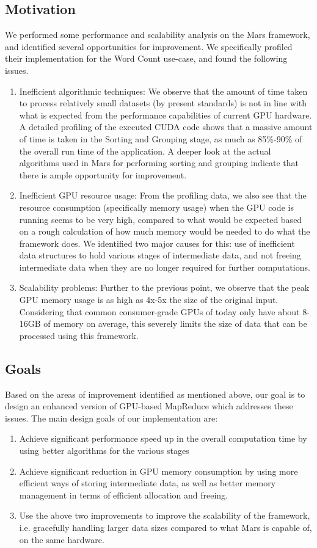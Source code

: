 \documentclass{article}
\begin{document}
\subsection{Motivation}
We performed some performance and scalability analysis on the Mars framework, and identified several opportunities for improvement. We specifically profiled their implementation for the Word Count use-case, and found the following issues. 
\begin{enumerate}
    \item Inefficient algorithmic techniques: We observe that the amount of time taken to process relatively small datasets (by present standards) is not in line with what is expected from the performance capabilities of current GPU hardware. A detailed profiling of the executed CUDA code shows that a massive amount of time is taken in the Sorting and Grouping stage, as much as 85\%-90\% of the overall run time of the application. A deeper look at the actual algorithms used in Mars for performing sorting and grouping indicate that there is ample opportunity for improvement.
    \item Inefficient GPU resource usage: From the profiling data, we also see that the resource consumption (specifically memory usage) when the GPU code is running seems to be very high, compared to what would be expected based on a rough calculation of how much memory would be needed to do what the framework does. We identified two major causes for this: use of inefficient data structures to hold various stages of intermediate data, and not freeing intermediate data when they are no longer required for further computations. 
    \item Scalability problems: Further to the previous point, we observe that the peak GPU memory usage is as high as 4x-5x the size of the original input. Considering that common consumer-grade GPUs of today only have about 8-16GB of memory on average, this severely limits the size of data that can be processed using this framework. 
\end{enumerate}

\subsection{Goals}
Based on the areas of improvement identified as mentioned above, our goal is to design an enhanced version of GPU-based MapReduce which addresses these issues. The main design goals of our implementation are:
\begin{enumerate}
    \item Achieve significant performance speed up in the overall computation time by using better algorithms for the various stages
    \item Achieve significant reduction in GPU memory consumption by using more efficient ways of storing intermediate data, as well as better memory management in terms of efficient allocation and freeing.
    \item Use the above two improvements to improve the scalability of the framework, i.e. gracefully handling larger data sizes compared to what Mars is capable of, on the same hardware.
\end{enumerate}
\end{document}
